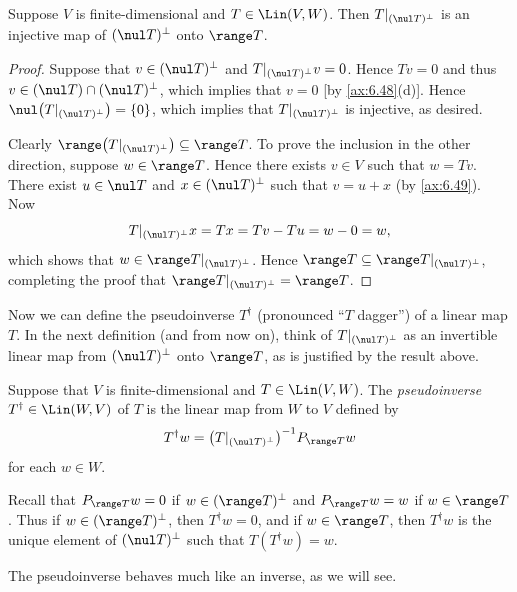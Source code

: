 \begin{result}\label{ax:6.67}
Suppose $V$ is finite-dimensional and $T\in\Lin(V,W)$. Then
$T|_{(\nul T)^\perp}$ is an injective map of $(\nul T)^\perp$ onto $\range T$.
\end{result}

\begin{proof}
Suppose that $v\in(\nul T)^\perp$ and $T|_{(\nul T)^\perp}v=0$. Hence $Tv=0$
and thus $v\in(\nul T)\cap(\nul T)^\perp$, which implies that $v=0$ [by
\ref{ax:6.48}(d)]. Hence $\nul\bigl(T|_{(\nul T)^\perp}\bigr)=\{0\}$, which
implies that $T|_{(\nul T)^\perp}$ is injective, as desired.

Clearly $\range\bigl(T|_{(\nul T)^\perp}\bigr)\subseteq\range T$. To prove the
inclusion in the other direction, suppose $w\in\range T$. Hence there exists
$v\in V$ such that $w=Tv$. There exist $u\in\nul T$ and $x\in(\nul T)^\perp$
such that $v=u+x$ (by \ref{ax:6.49}). Now
\[ T|_{(\nul T)^\perp}x = Tx = Tv-Tu = w-0 = w, \]
which shows that $w\in\range T|_{(\nul T)^\perp}$. Hence
$\range T\subseteq\range T|_{(\nul T)^\perp}$, completing the proof that
$\range T|_{(\nul T)^\perp}=\range T$.
\end{proof}

%
Now we can define the pseudoinverse $T^\dagger$ (pronounced ``$T$ dagger'') of
a linear map $T$. In the next definition (and from now on), think of
$T|_{(\nul T)^\perp}$ as an invertible linear map from $(\nul T)^\perp$ onto
$\range T$, as is justified by the result above.

\begin{definition}\label{ax:6.68}
Suppose that $V$ is finite-dimensional and $T\in\Lin(V,W)$. The
\emph{pseudoinverse} $T^\dagger\in\Lin(W,V)$ of $T$ is the linear map from $W$
to $V$ defined by
\[ T^\dagger w = \bigl(T|_{(\nul T)^\perp}\bigr)^{-1}P_{\range T}w \]
for each $w\in W$.
\end{definition}

Recall that $P_{\range T}w=0$ if $w\in(\range T)^\perp$ and
$P_{\range T}w=w$ if $w\in\range T$. Thus if $w\in(\range T)^\perp$, then
$T^\dagger w=0$, and if $w\in\range T$, then $T^\dagger w$ is the unique
element of $(\nul T)^\perp$ such that $T(T^\dagger w)=w$.

The pseudoinverse behaves much like an inverse, as we will see.

